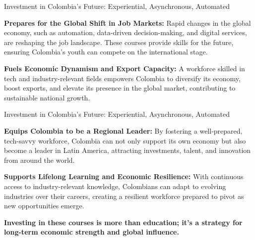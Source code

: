 \documentclass[
  ignorenonframetext,
]{beamer}
\begin{document}
\begin{frame}{Investment in Colombia's Future: Experiential,
Asynchronous, Automated}
\label{investment-in-colombias-future-experiential-asynchronous-automated-1}
\small

\textbf{Prepares for the Global Shift in Job Markets:} Rapid changes in
the global economy, such as automation, data-driven decision-making, and
digital services, are reshaping the job landscape. These courses provide
skills for the future, ensuring Colombia's youth can compete on the
international stage.

\textbf{Fuels Economic Dynamism and Export Capacity:} A workforce
skilled in tech and industry-relevant fields empowers Colombia to
diversify its economy, boost exports, and elevate its presence in the
global market, contributing to sustainable national growth.
\end{frame}

\begin{frame}{Investment in Colombia's Future: Experiential,
Asynchronous, Automated}
\label{investment-in-colombias-future-experiential-asynchronous-automated-2}
\small

\textbf{Equips Colombia to be a Regional Leader:} By fostering a
well-prepared, tech-savvy workforce, Colombia can not only support its
own economy but also become a leader in Latin America, attracting
investments, talent, and innovation from around the world.

\textbf{Supports Lifelong Learning and Economic Resilience:} With
continuous access to industry-relevant knowledge, Colombians can adapt
to evolving industries over their careers, creating a resilient
workforce prepared to pivot as new opportunities emerge.

\textbf{Investing in these courses is more than education; it's a
strategy for long-term economic strength and global influence.}
\end{frame}
\end{document}
